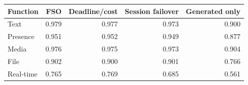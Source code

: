 \begin{tabular}{lrrrr}
\toprule
Function & FSO & Deadline/cost & Session failover & Generated only \\
\midrule
Text & 0.979 & 0.977 & 0.973 & 0.900 \\
Presence & 0.951 & 0.952 & 0.949 & 0.877 \\
Media & 0.976 & 0.975 & 0.973 & 0.904 \\
File & 0.902 & 0.900 & 0.901 & 0.766 \\
Real-time & 0.765 & 0.769 & 0.685 & 0.561 \\
\bottomrule
\end{tabular}
